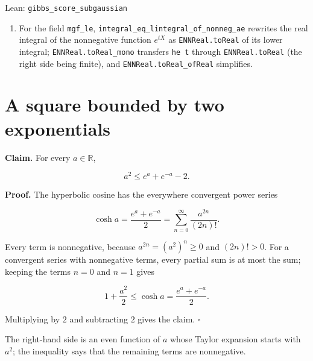 \documentclass[11pt,a4paper]{article}
\begin{document}
\begin{leanbox}{Lean: \texttt{gibbs\_\allowbreak{}score\_\allowbreak{}subgaussian}}
\begin{enumerate}
\item For the field \texttt{mgf\_\allowbreak{}le}, \texttt{integral\_\allowbreak{}eq\_\allowbreak{}lintegral\_\allowbreak{}of\_\allowbreak{}nonneg\_\allowbreak{}ae} rewrites the real integral of the nonnegative function \(e^{tX}\) as \texttt{ENNReal.\allowbreak{}to\allowbreak{}Real} of its lower integral; \texttt{ENNReal.\allowbreak{}to\allowbreak{}Real\_\allowbreak{}mono} transfers \texttt{he t} through \texttt{ENNReal.\allowbreak{}to\allowbreak{}Real} (the right side being finite), and \texttt{ENNReal.\allowbreak{}to\allowbreak{}Real\_\allowbreak{}of\allowbreak{}Real} simplifies.

\end{enumerate}
\end{leanbox}

\section{\texorpdfstring{A square bounded by two exponentials}{A square bounded by two exponentials}}


\textbf{Claim.} For every \(a\in\mathbb R\),


\[a^2\le e^a+e^{-a}-2.\]


\textbf{Proof.} The hyperbolic cosine has the everywhere convergent power series


\[\cosh a=\frac{e^a+e^{-a}}2=\sum_{n=0}^\infty\frac{a^{2n}}{(2n)!}.\]


Every term is nonnegative, because \(a^{2n}=(a^2)^n\ge0\) and \((2n)!>0\). For a convergent series with nonnegative terms, every partial sum is at most the sum; keeping the terms \(n=0\) and \(n=1\) gives


\[1+\frac{a^2}2\le\cosh a=\frac{e^a+e^{-a}}2.\]


Multiplying by \(2\) and subtracting \(2\) gives the claim. \(\square\)




The right-hand side is an even function of \(a\) whose Taylor expansion starts with \(a^2\); the inequality says that the remaining terms are nonnegative.
\end{document}
